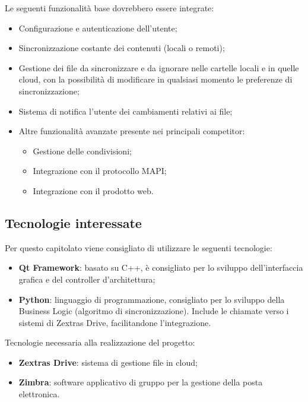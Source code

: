 \documentclass[../studio-di-fattibilita.tex]{subfiles}
\begin{document}
Le seguenti funzionalità base dovrebbero essere integrate:
\begin{itemize}
	\item Configurazione e autenticazione dell’utente;
	\item Sincronizzazione costante dei contenuti (locali o remoti);
	\item Gestione dei file da sincronizzare e da ignorare nelle cartelle locali e in quelle cloud, con la possibilità di modificare in qualsiasi momento le preferenze di sincronizzazione;
	\item Sistema di notifica l’utente dei cambiamenti relativi ai file;
	\item Altre funzionalità avanzate presente nei principali competitor:
	      \begin{itemize}
		      \item Gestione delle condivisioni;
		      \item Integrazione con il protocollo MAPI;
		      \item Integrazione con il prodotto web.
	      \end{itemize}
\end{itemize}

\subsection{Tecnologie interessate}%
\label{sub:c7_tecnologie_interessate}
Per questo capitolato viene consigliato di utilizzare le seguenti tecnologie:
\begin{itemize}
	\item \textbf{Qt Framework}: basato su C++, è consigliato per lo sviluppo dell’interfaccia grafica e del controller d’architettura;
	\item \textbf{Python}: linguaggio di programmazione, consigliato per lo sviluppo della Business Logic (algoritmo di sincronizzazione). Include le chiamate  verso i sistemi di Zextras Drive, facilitandone l’integrazione.
\end{itemize}

Tecnologie necessaria alla realizzazione del progetto:
\begin{itemize}
	\item \textbf{Zextras Drive}: sistema di gestione file in cloud;
	\item \textbf{Zimbra}: software applicativo di gruppo per la gestione della posta elettronica.
\end{itemize}
\end{document}
